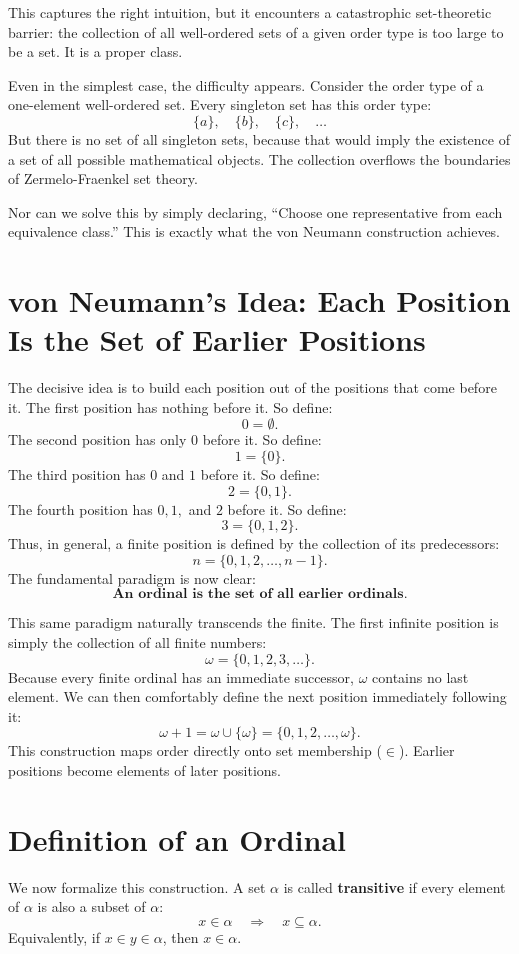\documentclass[11pt]{article}
\begin{document}
This captures the right intuition, but it encounters a catastrophic set-theoretic barrier: the collection of all well-ordered sets of a given order type is too large to be a set. It is a proper class.

Even in the simplest case, the difficulty appears. Consider the order type of a one-element well-ordered set. Every singleton set has this order type:
\[
\{a\},\quad \{b\},\quad \{c\},\quad \ldots
\]
But there is no set of all singleton sets, because that would imply the existence of a set of all possible mathematical objects. The collection overflows the boundaries of Zermelo-Fraenkel set theory.

Nor can we solve this by simply declaring, ``Choose one representative from each equivalence class.''  This is exactly what the von Neumann construction achieves.

\section{von Neumann's Idea: Each Position Is the Set of Earlier Positions}

The decisive idea is to build each position out of the positions that come before it.
The first position has nothing before it. So define:
\[
0=\emptyset.
\]
The second position has only $0$ before it. So define:
\[
1=\{0\}.
\]
The third position has $0$ and $1$ before it. So define:
\[
2=\{0,1\}.
\]
The fourth position has $0,1,$ and $2$ before it. So define:
\[
3=\{0,1,2\}.
\]
Thus, in general, a finite position is defined by the collection of its predecessors:
\[
n=\{0,1,2,\ldots,n-1\}.
\]
The fundamental paradigm is now clear:
\[
\textbf{An ordinal is the set of all earlier ordinals.}
\]

This same paradigm naturally transcends the finite. The first infinite position is simply the collection of all finite numbers:
\[
\omega=\{0,1,2,3,\ldots\}.
\]
Because every finite ordinal has an immediate successor, $\omega$ contains no last element. We can then comfortably define the next position immediately following it:
\[
\omega+1=\omega\cup\{\omega\} = \{0,1,2,\ldots, \omega\}.
\]
This construction maps order directly onto set membership ($\in$). Earlier positions become elements of later positions.

\section{Definition of an Ordinal}

We now formalize this construction. A set $\alpha$ is called \textbf{transitive} if every element of $\alpha$ is also a subset of $\alpha$:
\[
x\in\alpha \quad \Longrightarrow \quad x\subseteq\alpha.
\]
Equivalently, if $x\in y\in\alpha$, then $x\in\alpha$.
\end{document}
